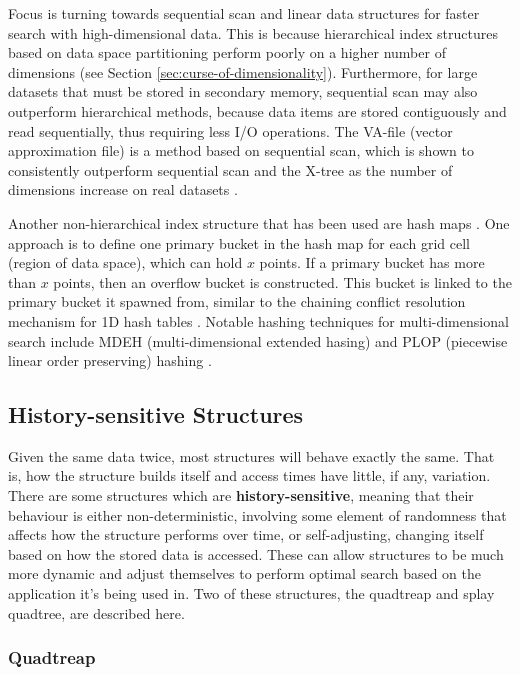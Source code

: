 Focus is turning towards sequential scan and linear data structures for faster search with high-dimensional data. This is because hierarchical index structures based on data space partitioning perform poorly on a higher number of dimensions (see Section \ref{sec:curse-of-dimensionality}). Furthermore, for large datasets that must be stored in secondary memory, sequential scan may also outperform hierarchical methods, because data items are stored contiguously and read sequentially, thus requiring less I/O operations. The VA-file (vector approximation file) is a method based on sequential scan, which is shown to consistently outperform sequential scan and the X-tree as the number of dimensions increase on real datasets \cite{va-file}.

Another non-hierarchical index structure that has been used are hash maps \cite{md-structures-samet}. One approach is to define one primary bucket in the hash map for each grid cell (region of data space), which can hold $x$ points. If a primary bucket has more than $x$ points, then an overflow bucket is constructed. This bucket is linked to the primary bucket it spawned from, similar to the chaining conflict resolution mechanism for 1D hash tables \cite{introduction-to-algorithms}. Notable hashing techniques for multi-dimensional search include MDEH (multi-dimensional extended hasing) and PLOP (piecewise linear order preserving) hashing \cite{md-structures-samet}.


\subsection{History-sensitive Structures}
\label{sec:history-sensitive-structures}

Given the same data twice, most structures will behave exactly the same. That is, how the structure builds itself and access times have little, if any, variation. There are some structures which are \textbf{history-sensitive}, meaning that their behaviour is either non-deterministic, involving some element of randomness that affects how the structure performs over time, or self-adjusting, changing itself based on how the stored data is accessed. These can allow structures to be much more dynamic and adjust themselves to perform optimal search based on the application it's being used in. Two of these structures, the quadtreap and splay quadtree, are described here.

\subsubsection{Quadtreap}

